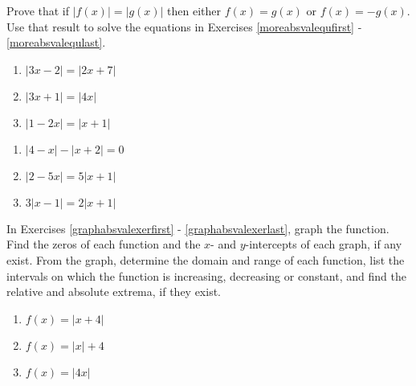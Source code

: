 Prove that if $|f(x)| = |g(x)|$ then either $f(x) = g(x)$ or $f(x) = -g(x)$. Use that result to solve the equations in Exercises \ref{moreabsvalequfirst} - \ref{moreabsvalequlast}.


\begin{multicols}{3}
\begin{enumerate}
\setcounter{enumi}{\value{HW}}

\item $|3x - 2| = |2x + 7|$  \label{moreabsvalequfirst}
\item $|3x+1| = |4x|$
\item $|1-2x| = |x+1|$

\setcounter{HW}{\value{enumi}}
\end{enumerate}
\end{multicols}


\begin{multicols}{3}
\begin{enumerate}
\setcounter{enumi}{\value{HW}}

\item  $|4-x| - |x+2| = 0$
\item $|2-5x| = 5 |x+1|$
\item $3|x-1| = 2|x+1|$ \label{moreabsvalequlast}


\setcounter{HW}{\value{enumi}}
\end{enumerate}
\end{multicols}



In Exercises \ref{graphabsvalexerfirst} - \ref{graphabsvalexerlast}, graph the function. Find the zeros of each function and the $x$- and $y$-intercepts of each graph, if any exist.  From the graph, determine the domain and range of each function, list the intervals on which the function is increasing, decreasing or constant, and find the relative and absolute extrema, if they exist.

\begin{multicols}{3}
\begin{enumerate}
\setcounter{enumi}{\value{HW}}

\item $f(x) = |x + 4|$ \label{graphabsvalexerfirst}
\item $f(x) = |x| + 4$
\item $f(x) = |4x|$


\setcounter{HW}{\value{enumi}}
\end{enumerate}
\end{multicols}


